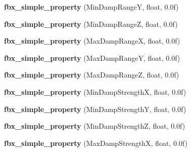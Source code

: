 \begin{DoxyCompactItemize}
\item 
\hypertarget{class_assimp_1_1_f_b_x_1_1_model_aea92431da263a4feb1432f6f9c080838}{{\bfseries fbx\+\_\+simple\+\_\+property} (Min\+Damp\+Range\+Y, float, 0.\+0f)}\label{class_assimp_1_1_f_b_x_1_1_model_aea92431da263a4feb1432f6f9c080838}

\item 
\hypertarget{class_assimp_1_1_f_b_x_1_1_model_af2e35921708959c1c50f7841ea524c9f}{{\bfseries fbx\+\_\+simple\+\_\+property} (Min\+Damp\+Range\+Z, float, 0.\+0f)}\label{class_assimp_1_1_f_b_x_1_1_model_af2e35921708959c1c50f7841ea524c9f}

\item 
\hypertarget{class_assimp_1_1_f_b_x_1_1_model_a6d0086fad74259c0a1877bc89414f8f9}{{\bfseries fbx\+\_\+simple\+\_\+property} (Max\+Damp\+Range\+X, float, 0.\+0f)}\label{class_assimp_1_1_f_b_x_1_1_model_a6d0086fad74259c0a1877bc89414f8f9}

\item 
\hypertarget{class_assimp_1_1_f_b_x_1_1_model_a13d764035ef4a48a8878d733296b8167}{{\bfseries fbx\+\_\+simple\+\_\+property} (Max\+Damp\+Range\+Y, float, 0.\+0f)}\label{class_assimp_1_1_f_b_x_1_1_model_a13d764035ef4a48a8878d733296b8167}

\item 
\hypertarget{class_assimp_1_1_f_b_x_1_1_model_a6f3499aa64a91db57a8db933bcb40c43}{{\bfseries fbx\+\_\+simple\+\_\+property} (Max\+Damp\+Range\+Z, float, 0.\+0f)}\label{class_assimp_1_1_f_b_x_1_1_model_a6f3499aa64a91db57a8db933bcb40c43}

\item 
\hypertarget{class_assimp_1_1_f_b_x_1_1_model_afbcbb4fe7af90e3a15a3b0e7a02f4d38}{{\bfseries fbx\+\_\+simple\+\_\+property} (Min\+Damp\+Strength\+X, float, 0.\+0f)}\label{class_assimp_1_1_f_b_x_1_1_model_afbcbb4fe7af90e3a15a3b0e7a02f4d38}

\item 
\hypertarget{class_assimp_1_1_f_b_x_1_1_model_aefb26b5abd4955feca21522fcc12bc59}{{\bfseries fbx\+\_\+simple\+\_\+property} (Min\+Damp\+Strength\+Y, float, 0.\+0f)}\label{class_assimp_1_1_f_b_x_1_1_model_aefb26b5abd4955feca21522fcc12bc59}

\item 
\hypertarget{class_assimp_1_1_f_b_x_1_1_model_af084113995bad960d35756002953f1bd}{{\bfseries fbx\+\_\+simple\+\_\+property} (Min\+Damp\+Strength\+Z, float, 0.\+0f)}\label{class_assimp_1_1_f_b_x_1_1_model_af084113995bad960d35756002953f1bd}

\item 
\hypertarget{class_assimp_1_1_f_b_x_1_1_model_a07e624d35ddf1b274ecf04b9e0873bbb}{{\bfseries fbx\+\_\+simple\+\_\+property} (Max\+Damp\+Strength\+X, float, 0.\+0f)}\label{class_assimp_1_1_f_b_x_1_1_model_a07e624d35ddf1b274ecf04b9e0873bbb}


\end{DoxyCompactItemize}
